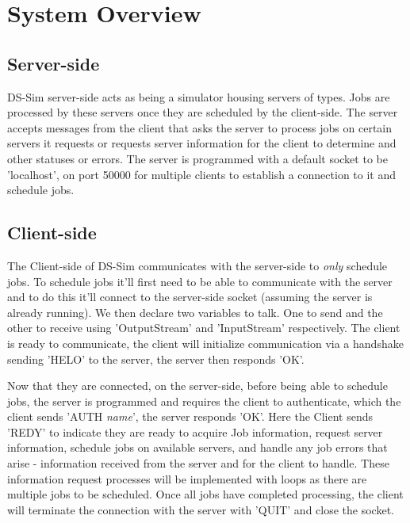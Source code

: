 \documentclass[a4paper]{article} %
\begin{document}

\section{System Overview}
\label{sec:section2}
\subsection*{Server-side}
DS-Sim server-side acts as being a simulator housing servers of types. Jobs are processed by these servers once they are scheduled by the client-side. The server accepts messages from the client that asks the server to process jobs on certain servers it requests or requests server information for the client to determine and other statuses or errors. The server is programmed with a default socket to be 'localhost', on port 50000 for multiple clients to establish a connection to it and schedule jobs.

\subsection*{Client-side}
The Client-side of DS-Sim communicates with the server-side to \textit{only} schedule jobs. To schedule jobs it'll first need to be able to communicate with the server and to do this it'll connect to the server-side socket (assuming the server is already running). We then declare two variables to talk. One to send and the other to receive using 'OutputStream' and 'InputStream' respectively. The client is ready to communicate, the client will initialize communication via a handshake sending 'HELO' to the server, the server then responds 'OK'.

\bigskip
Now that they are connected, on the server-side, before being able to schedule jobs, the server is programmed and requires the client to authenticate, which the client sends 'AUTH \textit{name}', the server responds 'OK'. Here the Client sends 'REDY' to indicate they are ready to acquire Job information, request server information, schedule jobs on available servers, and handle any job errors that arise - information received from the server and for the client to handle. These information request processes will be implemented with loops as there are multiple jobs to be scheduled. Once all jobs have completed processing, the client will terminate the connection with the server with 'QUIT' and close the socket.
\end{document}
